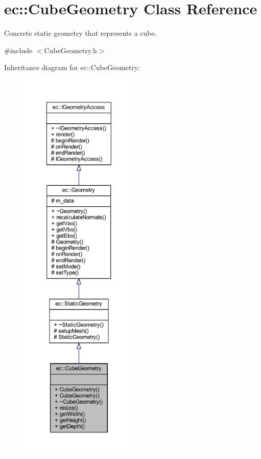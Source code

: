 \hypertarget{classec_1_1_cube_geometry}{}\section{ec\+:\+:Cube\+Geometry Class Reference}
\label{classec_1_1_cube_geometry}


Concrete static geometry that represents a cube.  




{\ttfamily \#include $<$Cube\+Geometry.\+h$>$}



Inheritance diagram for ec\+:\+:Cube\+Geometry\+:\nopagebreak
\begin{figure}[H]
\begin{center}
\leavevmode
\includegraphics[height=550pt]{classec_1_1_cube_geometry__inherit__graph}
\end{center}
\end{figure}


